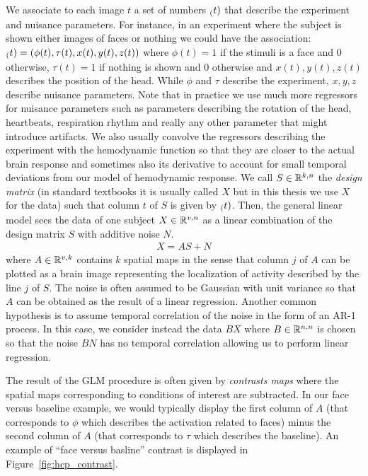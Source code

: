 We associate to each image $t$ a set of numbers $\sb(t)$ that describe the experiment and
nuisance parameters.
For instance, in an experiment where the subject is shown either images of faces
or nothing we could have the association: $\sb(t) = (\phi(t), \tau(t), x(t), y(t),
z(t))$ where $\phi(t)=1$ if the stimuli is a face and $0$ otherwise, $\tau(t)=1$
if nothing is shown and $0$ otherwise and  $x(t), y(t), z(t)$ describes the
position of the head. While $\phi$ and $\tau$ describe the experiment, $x, y, z$
describe nuisance parameters.
Note that in practice we use much more regressors for nuisance parameters such
as parameters describing the rotation of the head, heartbeats, respiration
rhythm and really any other parameter that might introduce artifacts. We also
usually convolve the regressors describing the experiment with the hemodynamic
function so that they are closer to the actual brain response and sometimes also its derivative to account for small temporal deviations from our model of hemodynamic response.
We call $S \in \mathbb{R}^{k, n}$ the \emph{design matrix} (in standard textbooks it is
usually called $X$ but in this thesis we use $X$ for the data) such that column
$t$ of $S$ is given by $\sb(t)$.
Then, the general linear model sees the data of one subject $X \in \mathbb{R}^{v, n}$ as a linear combination of the
design matrix $S$ with additive noise $N$.
\begin{align}
X = A S + N
\end{align}
where $A \in \mathbb{R}^{v, k}$ contains $k$ spatial maps in the sense that column $j$
of $A$ can be plotted as a brain image representing the localization of activity
described by the line $j$ of $S$.
The noise is often assumed to be Gaussian with unit variance so that $A$ can be obtained as the
result of a linear regression. Another common hypothesis is to assume temporal
correlation of the noise in the form of an AR-1 process. In this case, we 
consider instead the data $BX$ where $B \in \mathbb{R}^{n, n}$ is chosen so that the
noise $BN$ has no temporal correlation allowing us to perform linear regression.

The result of the GLM procedure is often given by \emph{contrasts maps} where
the spatial maps corresponding to conditions of interest are subtracted.
In our face versus baseline example, we would typically display the first column of
$A$ (that corresponds to $\phi$ which describes the activation related to faces) minus
the second column of $A$ (that corresponds to $\tau$ which describes the
baseline). An example of ``face versus basline'' contrast is displayed in
Figure~\ref{fig:hcp_contrast}.

